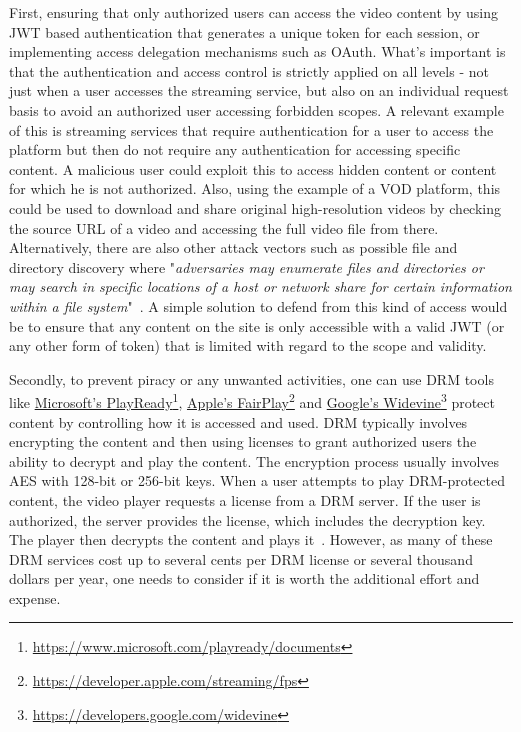 First, ensuring that only authorized users can access the video content by using \ac{JWT} based authentication that generates a unique token for each session, or implementing access delegation mechanisms such as OAuth. What's important is that the authentication and access control is strictly applied on all levels - not just when a user accesses the streaming service, but also on an individual request basis to avoid an authorized user accessing forbidden scopes. A relevant example of this is streaming services that require authentication for a user to access the platform but then do not require any authentication for accessing specific content. A malicious user could exploit this to access hidden content or content for which he is not authorized. Also, using the example of a \ac{VOD} platform, this could be used to download and share original high-resolution videos by checking the source URL of a video and accessing the full video file from there.
Alternatively, there are also other attack vectors such as possible file and directory discovery where "\textit{adversaries may enumerate files and directories or may search in specific locations of a host or network share for certain information within a file system}"~\parencite{mitre}. A simple solution to defend from this kind of access would be to ensure that any content on the site is only accessible with a valid \ac{JWT} (or any other form of token) that is limited with regard to the scope and validity.

Secondly, to prevent piracy or any unwanted activities, one can use \ac{DRM} tools like \href{https://www.microsoft.com/playready/documents}{Microsoft's PlayReady}\footnote{\url{https://www.microsoft.com/playready/documents}}, \href{https://developer.apple.com/streaming/fps}{Apple's FairPlay}\footnote{\url{https://developer.apple.com/streaming/fps}} and \href{https://developers.google.com/widevine}{Google's Widevine}\footnote{\url{https://developers.google.com/widevine}} protect content by controlling how it is accessed and used. \ac{DRM} typically involves encrypting the content and then using licenses to grant authorized users the ability to decrypt and play the content. The encryption process usually involves \ac{AES} with 128-bit or 256-bit keys. When a user attempts to play \ac{DRM}-protected content, the video player requests a license from a \ac{DRM} server. If the user is authorized, the server provides the license, which includes the decryption key. The player then decrypts the content and plays it~\parencite{drm}. However, as many of these \ac{DRM} services cost up to several cents per \ac{DRM} license or several thousand dollars per year, one needs to consider if it is worth the additional effort and expense.

